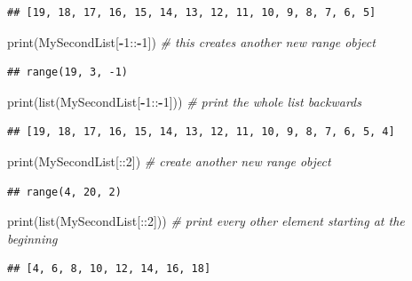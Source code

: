 \documentclass[
]{book}
\newenvironment{Shaded}{\begin{snugshade}}{\end{snugshade}}
\newcommand{\BuiltInTok}[1]{#1}
\newcommand{\CommentTok}[1]{\textcolor[rgb]{0.56,0.35,0.01}{\textit{#1}}}
\newcommand{\DecValTok}[1]{\textcolor[rgb]{0.00,0.00,0.81}{#1}}
\newcommand{\NormalTok}[1]{#1}
\newcommand{\OperatorTok}[1]{\textcolor[rgb]{0.81,0.36,0.00}{\textbf{#1}}}
\theoremstyle{definition}
\theoremstyle{definition}
\theoremstyle{definition}
\theoremstyle{remark}
\begin{document}
\begin{verbatim}
## [19, 18, 17, 16, 15, 14, 13, 12, 11, 10, 9, 8, 7, 6, 5]
\end{verbatim}

\begin{Shaded}
\begin{Highlighting}[]
\BuiltInTok{print}\NormalTok{(MySecondList[}\OperatorTok{{-}}\DecValTok{1}\NormalTok{::}\OperatorTok{{-}}\DecValTok{1}\NormalTok{]) }\CommentTok{\# this creates another new range object}
\end{Highlighting}
\end{Shaded}

\begin{verbatim}
## range(19, 3, -1)
\end{verbatim}

\begin{Shaded}
\begin{Highlighting}[]
\BuiltInTok{print}\NormalTok{(}\BuiltInTok{list}\NormalTok{(MySecondList[}\OperatorTok{{-}}\DecValTok{1}\NormalTok{::}\OperatorTok{{-}}\DecValTok{1}\NormalTok{])) }\CommentTok{\# print the whole list backwards}
\end{Highlighting}
\end{Shaded}

\begin{verbatim}
## [19, 18, 17, 16, 15, 14, 13, 12, 11, 10, 9, 8, 7, 6, 5, 4]
\end{verbatim}

\begin{Shaded}
\begin{Highlighting}[]
\BuiltInTok{print}\NormalTok{(MySecondList[::}\DecValTok{2}\NormalTok{]) }\CommentTok{\# create another new range object}
\end{Highlighting}
\end{Shaded}

\begin{verbatim}
## range(4, 20, 2)
\end{verbatim}

\begin{Shaded}
\begin{Highlighting}[]
\BuiltInTok{print}\NormalTok{(}\BuiltInTok{list}\NormalTok{(MySecondList[::}\DecValTok{2}\NormalTok{])) }\CommentTok{\# print every other element starting at the beginning}
\end{Highlighting}
\end{Shaded}

\begin{verbatim}
## [4, 6, 8, 10, 12, 14, 16, 18]
\end{verbatim}
\end{document}
